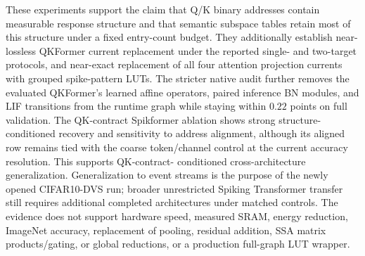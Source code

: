 These experiments support the claim that Q/K binary addresses contain
measurable response structure and that semantic subspace tables retain most of
this structure under a fixed entry-count budget. They additionally establish
near-lossless QKFormer current replacement under the reported single- and
two-target protocols, and near-exact replacement of all four attention
projection currents with grouped spike-pattern LUTs. The stricter native audit
further removes the evaluated QKFormer's learned affine operators, paired
inference BN modules, and LIF transitions from the runtime graph while staying
within $0.22$ points on full validation. The QK-contract Spikformer ablation
shows strong structure-conditioned recovery and sensitivity to address
alignment, although its aligned row remains tied with the coarse token/channel
control at the current accuracy resolution. This supports QK-contract-
conditioned cross-architecture generalization. Generalization to event streams
is the purpose of the newly opened CIFAR10-DVS run; broader unrestricted
Spiking Transformer transfer still requires additional completed architectures
under matched controls. The evidence does not support hardware speed, measured
SRAM, energy reduction, ImageNet accuracy, replacement of pooling, residual
addition, SSA matrix products/gating, or global reductions, or a production
full-graph LUT wrapper.
